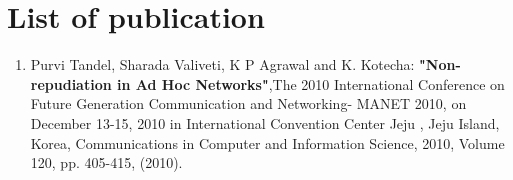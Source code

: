 \chapter{List of publication}\label{publication}
\begin{enumerate}
  \item {Purvi Tandel, Sharada Valiveti, K P Agrawal and K. Kotecha: \textbf{"Non-repudiation in Ad Hoc Networks"},The 2010 International Conference on Future Generation Communication and Networking- MANET 2010, on December 13-15, 2010 in International Convention Center Jeju , Jeju Island, Korea, Communications in Computer and Information Science, 2010, Volume 120, pp. 405-415, (2010).}
\end{enumerate}
